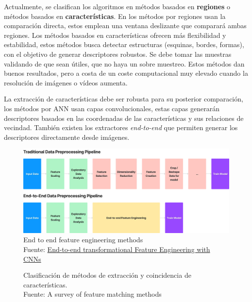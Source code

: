 Actualmente, se clasifican los algoritmos en métodos basados en \textbf{regiones} o métodos basados en \textbf{características}. En los métodos por regiones usan la comparación directa, estos emplean una ventana deslizante que comparará ambas regiones. Los métodos basados en características ofrecen más flexibilidad y estabilidad, estos métodos busca detectar estructuras (esquinas, bordes, formas), con el objetivo de generar descriptores robustos. Se debe tomar las muestras validando de que sean útiles, que no haya un sobre muestreo. Estos métodos dan buenos resultados, pero a costa de un coste computacional muy elevado cuando la resolución de imágenes o vídeos aumenta.

La extracción de características debe ser robusta para su posterior comparación, los métodos por \gls{ANN} usan capas convolucionales, estas capas generarán descriptores basados en las coordenadas de las características y sus relaciones de vecindad. También existen los extractores \textit{end-to-end} que permiten generar los descriptores directamente desde imágenes.

\begin{figure}[H]
    \centering
    \includegraphics[width=0.5\linewidth]{figures/chapter02/end-to-end.png}
    \caption{End to end feature engineering methods \\Fuente: \href{https://ryendu.medium.com/end-to-end-transformational-feature-engineering-with-cnns-52a5125a10}{End-to-end transformational Feature Engineering with CNNs}}
    \label{fig:end-to-end-cnn}
\end{figure}

\begin{figure}[H]
    \centering
    \centerline{}
    \caption{Clasificación de métodos de extracción y coincidencia de características. \\Fuente: A survey of feature matching methods \cite{A-survey-of-feature-matching-methods}}
    \label{fig:classification-of-feature-matching-methods}
\end{figure}

